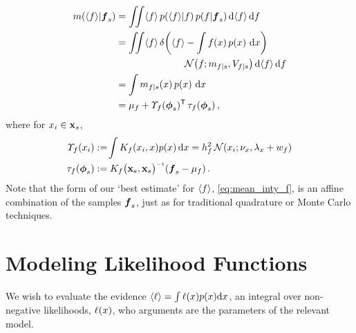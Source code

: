 \documentclass{article}
\begin{document}
\begin{align} \label{eq:mean_inty_f}
\mean{\inty{f}}{\vf_s}
& 
=\iint \inty{f}\,\p{\inty{f}}{f}\p{f}{\vf_s} \ud \inty{f} \,\ud f                                                                                                                                                               \nonumber\\
&
 =\iint \inty{f}\,\dd{\inty{f}}{\int f(\lfv)\,\po{\lfv}\,\ud\lfv}
\nonumber\\
&\hspace{2.5cm}
\N{f}{\meancondfn{f}{s}}{\covcondfn{f}{s}} \ud \inty{f} \,\ud f \nonumber\\
&
 = \int \meancondfn{f}{s}(\lfv)\,\po{\lfv}\,\ud\lfv\nonumber\\
&
 = 
\mu_f + \ntT{s}{f}\, \dtt{s}{f}
\,,
\end{align}
where for $\lfv_i \in \vlfv_s$,
\begin{align*}
\fnt{\lfv_i}{f} & \deq \!\int K_f(\lfv_i,\lfv)\po{\lfv}\ud\lfv
 = h_f^2\,\N{\lfv_i}{\nu_{\lfv}}{\lambda_{\lfv}+w_{f}}\\
\dtt{s}{f} & \deq K_{f}\bigl(\vlfv_s,\vlfv_s\bigr)\inv (\vf_s-{\mu}_{f})\,.
\end{align*}
Note that the form of our `best estimate' for $\inty{f}$, \eqref{eq:mean_inty_f}, is an affine combination of the samples $\vf_s$, just as for traditional quadrature or Monte Carlo techniques. 



\section{Modeling Likelihood Functions}

We wish to evaluate the evidence $\inty{\lfn} = \int \lfn(\lfv) p(\lfv) \ud\lfv$, an integral over non-negative likelihoods, $\lfn(\lfv)$, who arguments are the parameters of the relevant model.
\end{document}
